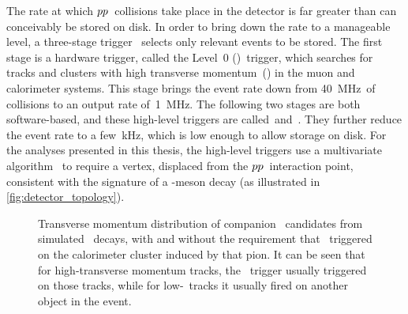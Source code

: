 The rate at which \({{p}{p}}\)~collisions take place in the detector is far greater than can conceivably be stored on disk.
In order to bring down the rate to a manageable level, a three-stage trigger~\cite{LHCb-DP-2012-004} selects only relevant events to be stored.
The first stage is a hardware trigger, called the Level~0 (\lzero)~trigger, which searches for tracks and clusters with high transverse momentum~(\pt) in the muon and calorimeter systems.
This stage brings the event rate down from \SI{40}{\MHz}~of collisions to an output rate of~\SI{1}{\MHz}.
The following two stages are both software-based, and these high-level triggers are called~\hltone and~\hlttwo.
They further reduce the event rate to a few~\si{\kHz}, which is low enough to allow storage on disk.
For the analyses presented in this thesis, the high-level triggers use a multivariate algorithm~\cite{Gligorov:2012qt} to require a vertex, displaced from the \({{p}{p}}\)~interaction point, consistent with the signature of a \bquark-meson decay (as illustrated in \cref{fig:detector_topology}).

\begin{figure}[htb] \centerfloat
    \caption{
        Transverse momentum distribution of companion \pipm~candidates from simulated \BsDsPi~decays, with and without the requirement that \lzero~triggered on the calorimeter cluster induced by that pion.
        It can be seen that for high-transverse momentum tracks, the \lzero~trigger usually triggered on those tracks, while for low-\pt~tracks it usually fired on another object in the event.}
    \label{fig:detector_companion_PT}
\end{figure}

